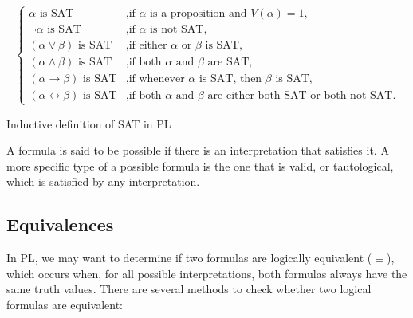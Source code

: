 \begin{table}[h]
\[
\left\{
\begin{array}{ll}
    \alpha \text{ is SAT}  & \text{,if } \alpha \text{ is a proposition and } V(\alpha) = 1, \\
    \neg \alpha \text{ is SAT} & \text{,if } \alpha \text{ is not SAT,} \\
    (\alpha \lor \beta) \text{ is SAT} & \text{,if either } \alpha \text{ or } \beta \text{ is SAT,} \\
    (\alpha \land \beta) \text{ is SAT} & \text{,if both } \alpha \text{ and } \beta \text{ are SAT,} \\
    (\alpha \rightarrow \beta) \text{ is SAT} & \text{,if whenever } \alpha \text{ is SAT, then } \beta \text{ is SAT,} \\
    (\alpha \leftrightarrow \beta) \text{ is SAT} & \text{,if both } \alpha \text{ and } \beta \text{ are either both SAT or both not SAT.}
\end{array}
\right.
\]

\caption{Inductive definition of SAT in \gls{PL}}
\label{tab:sat_rules}
\end{table}

A formula is said to be possible if there is an interpretation that satisfies it. A more specific type of a possible formula is the one that is valid, or tautological, which is satisfied by any interpretation.

\subsection{Equivalences}
\label{chap:prop-equivalences}
In \gls{PL}, we may want to determine if two formulas are logically equivalent (\(\equiv\)), which occurs when, for all possible interpretations, both formulas always have the same truth values. There are several methods to check whether two logical formulas are equivalent:

